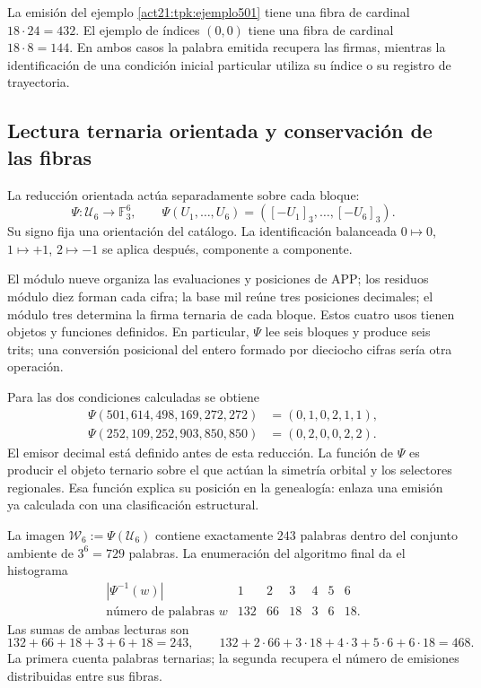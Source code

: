 La emisión del ejemplo \ref{act21:tpk:ejemplo501} tiene una fibra de cardinal
\(18\cdot24=432\). El ejemplo de índices \((0,0)\) tiene una fibra de
cardinal \(18\cdot8=144\). En ambos casos la palabra emitida recupera
las firmas, mientras la identificación de una condición inicial particular
utiliza su índice o su registro de trayectoria.

\subsection{Lectura ternaria orientada y conservación de las fibras}
\label{act21:tpk:reduccion-ternaria}

La reducción orientada actúa separadamente sobre cada bloque:
\begin{equation}
 \Psi:\mathcal U_6\longrightarrow\mathbb F_3^6,\qquad
 \Psi(U_1,\ldots,U_6)=([-U_1]_3,\ldots,[-U_6]_3).
 \label{act21:tpk:psi}
\end{equation}
Su signo fija una orientación del catálogo. La identificación balanceada
\(0\mapsto0\), \(1\mapsto+1\), \(2\mapsto-1\) se aplica después,
componente a componente.

El módulo nueve organiza las evaluaciones y posiciones de APP; los residuos
módulo diez forman cada cifra; la base mil reúne tres posiciones decimales;
el módulo tres determina la firma ternaria de cada bloque. Estos cuatro usos
tienen objetos y funciones definidos. En particular, \(\Psi\) lee seis
bloques y produce seis trits; una conversión posicional del entero formado
por dieciocho cifras sería otra operación.

Para las dos condiciones calculadas se obtiene
\begin{align*}
 \Psi(501,614,498,169,272,272)&=(0,1,0,2,1,1),\\
 \Psi(252,109,252,903,850,850)&=(0,2,0,0,2,2).
\end{align*}
El emisor decimal está definido antes de esta reducción. La función de
\(\Psi\) es producir el objeto ternario sobre el que actúan la simetría
orbital y los selectores regionales. Esa función explica su posición en la
genealogía: enlaza una emisión ya calculada con una clasificación estructural.

La imagen \(\mathcal W_6:=\Psi(\mathcal U_6)\) contiene exactamente
\(243\) palabras dentro del conjunto ambiente de \(3^6=729\) palabras.
La enumeración del algoritmo final da el histograma
\begin{equation}
\begin{array}{c|rrrrrr}
 |\Psi^{-1}(w)|&1&2&3&4&5&6\\\hline
 \text{número de palabras }w&132&66&18&3&6&18.
\end{array}
\label{act21:tpk:fibras-ternarias}
\end{equation}
Las sumas de ambas lecturas son
\[
132+66+18+3+6+18=243,
\qquad132+2\cdot66+3\cdot18+4\cdot3+5\cdot6+6\cdot18=468.
\]
La primera cuenta palabras ternarias; la segunda recupera el número de
emisiones distribuidas entre sus fibras.

